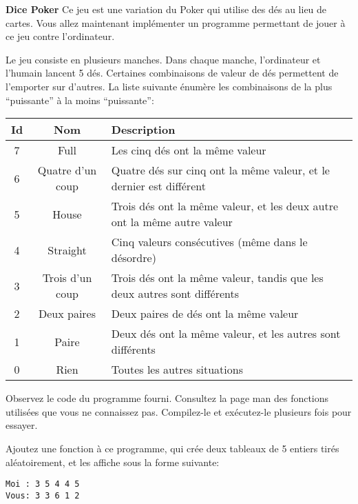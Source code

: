 \documentclass[10pt]{article}\usepackage[nu]{esial}
\begin{document}
\begin{Exercice}\textbf{Dice Poker}
  Ce jeu est une variation du Poker qui utilise des dés au lieu de cartes. Vous
  allez maintenant implémenter un programme permettant de jouer à ce jeu contre
  l'ordinateur.

  Le jeu consiste en plusieurs manches. Dans chaque manche, l'ordinateur et
  l'humain lancent 5 dés. Certaines combinaisons de valeur de dés permettent de
  l'emporter sur d'autres. La liste suivante énumère les combinaisons de la
  plus ``puissante'' à la moins ``puissante'':
  \begin{tabular}{|c|c|l|}\hline
    \textbf{Id}&\textbf{Nom}&\textbf{Description}\\\hline
    7&Full& Les cinq dés ont la même valeur\\\hline
    6&Quatre d'un coup& Quatre dés sur cinq ont la même valeur, et le dernier
                        est différent\\\hline
    5&House&Trois dés ont la même valeur, et les deux
            autre ont la même autre valeur\\\hline
    4&Straight& Cinq valeurs consécutives (même dans le
                désordre)\\\hline
    3&Trois d'un coup&Trois dés ont la même valeur, tandis que les
                      deux autres sont différents\\\hline
    2&Deux paires&Deux paires de dés ont la même valeur\\\hline
    1&Paire&Deux dés ont la même valeur, et les autres sont
            différents\\\hline
    0&Rien&Toutes les autres situations\\\hline
  \end{tabular}
  
  \Question Observez le code du programme  fourni.
  Consultez la page man des fonctions utilisées que vous ne connaissez
  pas. Compilez-le et exécutez-le plusieurs fois pour essayer.

  \noindent\begin{minipage}{.77\linewidth}
    \Question Ajoutez une fonction  à ce programme, qui crée
    deux tableaux de 5 entiers tirés aléatoirement, et les affiche sous la
    forme suivante:
  \end{minipage}\hfill\begin{minipage}{.19\linewidth}
    \begin{Verbatim}
Moi : 3 5 4 4 5
Vous: 3 3 6 1 2
    \end{Verbatim}
  \end{minipage}
  

\end{Exercice}
\end{document}
